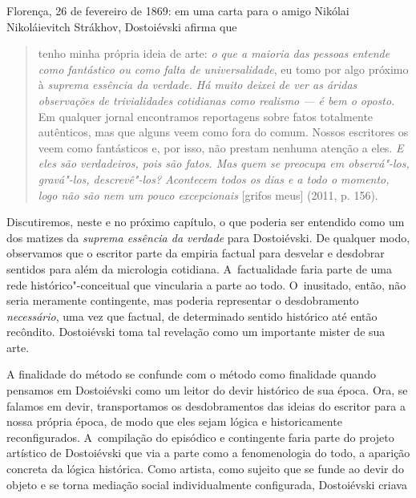 Florença, 26 de fevereiro de 1869: em uma carta para o amigo Nikólai
Nikoláievitch Strákhov, Dostoiévski afirma que

\begin{quote}
tenho minha própria ideia de arte: \emph{o que a maioria das pessoas
entende como fantástico ou como falta de universalidade}, eu tomo por
algo próximo à \emph{suprema essência da verdade. Há muito deixei de ver
as áridas observações de trivialidades cotidianas como realismo --- é bem
o oposto.} Em qualquer jornal encontramos reportagens sobre fatos
totalmente autênticos, mas que alguns veem como fora do comum. Nossos
escritores os veem como fantásticos e, por isso, não prestam nenhuma
atenção a eles. \emph{E eles são verdadeiros, pois são fatos. Mas quem
se preocupa em observá"-los, gravá"-los, descrevê"-los? Acontecem todos os
dias e a todo o momento, logo não são nem um pouco excepcionais}
{[}grifos meus{]} (2011, p. 156).
\end{quote}

Discutiremos, neste e no próximo capítulo, o que poderia ser entendido
como um dos matizes da \emph{suprema essência da verdade} para
Dostoiévski. De qualquer modo, observamos que o escritor parte da
empiria factual para desvelar e desdobrar sentidos para além da
micrologia cotidiana. A~factualidade faria parte de uma rede
histórico"-conceitual que vincularia a parte ao todo. O~inusitado, então,
não seria meramente contingente, mas poderia representar o desdobramento
\emph{necessário}, uma vez que factual, de determinado sentido histórico
até então recôndito. Dostoiévski toma tal revelação como um importante
mister de sua arte.

A finalidade do método se confunde com o método como finalidade quando
pensamos em Dostoiévski como um leitor do devir histórico de sua época.
Ora, se falamos em devir, transportamos os desdobramentos das ideias do
escritor para a nossa própria época, de modo que eles sejam lógica e
historicamente reconfigurados. A~compilação do episódico e contingente
faria parte do projeto artístico de Dostoiévski que via a parte como a
fenomenologia do todo, a aparição concreta da lógica histórica. Como
artista, como sujeito que se funde ao devir do objeto e se torna
mediação social individualmente configurada, Dostoiévski criava

